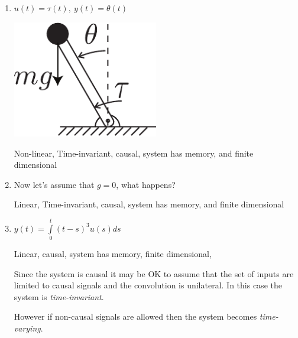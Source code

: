 \documentclass[twoside]{article}
\begin{document}
\begin{enumerate}

\item 

  \begin{minipage}[h]{0.5\linewidth}
      $u(t) = \tau(t) , \ y(t) = \theta(t)$
  \end{minipage}
  \begin{minipage}[h]{0.5\linewidth}
    \begin{center}
      \includegraphics[width=0.5\textwidth]{pendulum}
    \end{center}
  \end{minipage}

\vspace{6pt}

Non-linear, Time-invariant, causal, system has memory, and finite dimensional

\vspace{6pt}

\item  Now let's assume that $g = 0$, what happens?

\vspace{6pt}

Linear, Time-invariant, causal, system has memory, and finite dimensional

\vspace{6pt}

\item $y(t) = \int\limits_{0}^{t} (t-s)^3 u(s) ds$

\vspace{6pt}

Linear, causal, system has memory, finite dimensional,

Since the system is causal it may be OK to assume that the set of
inputs are limited to causal signals and the convolution is unilateral.
In this case the system is \textit{time-invariant}.

\vspace{6pt}

However if non-causal signals are allowed then the system becomes
\textit{time-varying}. 

\end{enumerate}
\end{document}
